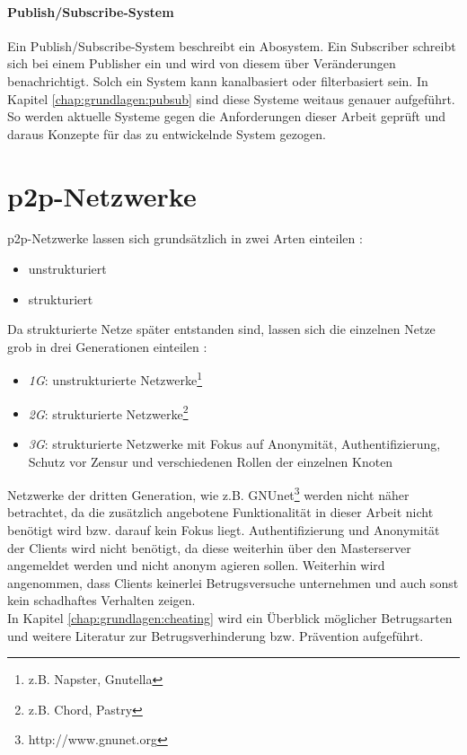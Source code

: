 \paragraph{Publish/Subscribe-System} Ein Publish/Subscribe-System beschreibt ein Abosystem. Ein Subscriber schreibt sich bei einem Publisher ein und wird von diesem über Veränderungen benachrichtigt. Solch ein System kann kanalbasiert oder filterbasiert sein. In Kapitel \ref{chap:grundlagen:pubsub} sind diese Systeme weitaus genauer aufgeführt. So werden aktuelle Systeme gegen die Anforderungen dieser Arbeit geprüft und daraus Konzepte für das zu entwickelnde System gezogen.


\section{p2p-Netzwerke}
\label{chap:grundlagen:p2p}
p2p-Netzwerke lassen sich grundsätzlich in zwei Arten einteilen \cite{Steinmetz2005, Lua2005Survey}: 
\begin{itemize}
\item unstrukturiert
\item strukturiert
\end{itemize}

Da strukturierte Netze später entstanden sind, lassen sich die einzelnen Netze grob in drei Generationen einteilen \cite{Bo2003PeertoPeer}:
\begin{itemize}
	\item \emph{1G}: unstrukturierte Netzwerke\footnote{z.B. Napster, Gnutella}
	\item \emph{2G}: strukturierte Netzwerke\footnote{z.B. Chord, Pastry}
	\item \emph{3G}: strukturierte Netzwerke mit Fokus auf Anonymität, Authentifizierung, Schutz vor Zensur und verschiedenen Rollen der einzelnen Knoten
\end{itemize}

Netzwerke der dritten Generation, wie z.B. GNUnet\footnote{http://www.gnunet.org} \cite{Grothoff2002GNET} werden nicht näher betrachtet, da die zusätzlich angebotene Funktionalität in dieser Arbeit nicht benötigt wird bzw. darauf kein Fokus liegt. Authentifizierung und Anonymität der Clients wird nicht benötigt, da diese weiterhin über den Masterserver angemeldet werden und nicht anonym agieren sollen. Weiterhin wird angenommen, dass Clients keinerlei Betrugsversuche unternehmen und auch sonst kein schadhaftes Verhalten zeigen.\\
In Kapitel \ref{chap:grundlagen:cheating} wird ein Überblick möglicher Betrugsarten und weitere Literatur zur Betrugsverhinderung bzw. Prävention aufgeführt.

